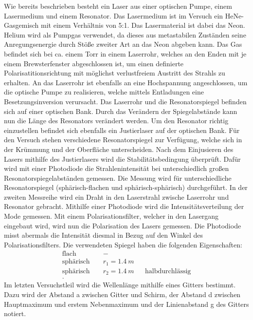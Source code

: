 Wie bereits beschrieben besteht ein Laser aus einer optischen Pumpe, einem Lasermedium und einem Resonator.
Das Lasermedium ist im Versuch ein HeNe-Gasgemisch mit einem Verhältnis von 5:1.
Das Lasermaterial ist dabei das Neon.
Helium wird als Pumpgas verwendet, da dieses aus metastabilen Zuständen seine Anregungsenergie durch Stöße zweiter Art an das Neon abgeben kann.
Das Gas befindet sich bei ca. einem Torr in einem Laserrohr, welches an den Enden mit je einem Brewsterfenster abgeschlossen ist, um einen
definierte Polarisatitionsrichtung mit möglichst verlustfreiem Austritt des Strahls zu erhalten.
An das Laserrohr ist ebenfalls an eine Hochspannung angeschlossen, um die optische Pumpe zu realisieren, welche mittels Entladungen eine Besetzungsinversion verursacht.
Das Laserrohr und die Resonatorspiegel befinden sich auf einer optischen Bank.
Durch das Verändern der Spiegelabstände kann nun die Länge des Resonators verändert werden.
Um den Resonator richtig einzustellen befindet sich ebenfalls ein Justierlaser auf der optischen Bank.
Für den Versuch stehen verschiedene Resonatorspiegel zur Verfügung, welche sich in der Krümmung und der Oberfläche unterscheiden.
Nach dem Einjusieren des Lasers mithilfe des Justierlasers wird die Stabilitätsbedingung überprüft.
Dafür wird mit einer Photodiode die Strahlenintensität bei unterschiedlich großen Resonatorspiegelabständen gemessen.
Die Messung wird für unterschiedliche Resonatorspiegel (sphärisch-flachen und sphärisch-sphärisch) durchgeführt.
In der zweiten Messreihe wird ein Draht in den Laserstrahl zwische Laserrohr und Resonator gebracht.
Mithilfe einer Photodiode wird die Intensitätsverteilung der Mode gemessen.
%
Mit einem Polarisationsfilter, welcher in den Lasergang eingebaut wird, wird nun die Polarisation des Lasers gemessen.
Die Photodiode misst abermals die Intensität diesmal in Bezug auf den Winkel des Polarisationsfilters.
%
Die verwendeten Spiegel haben die folgenden Eigenschaften:
\begin{align*}
\text{flach }      &&       -       && \\
\text{sphärisch }  && r_{1}=\SI{1.4}{m} && \\
\text{sphärisch }  && r_{2}=\SI{1.4}{m} && \text{halbdurchlässig}\\.
\end{align*}
%
Im letzten Versuchstleil wird die Wellenlänge mithilfe eines Gitters bestimmt.
Dazu wird der Abstand a zwischen Gitter und Schirm, der Abstand d zwischen Hauptmaximum und erstem Nebenmaximum und der Linienabstand g des Gitters notiert.
